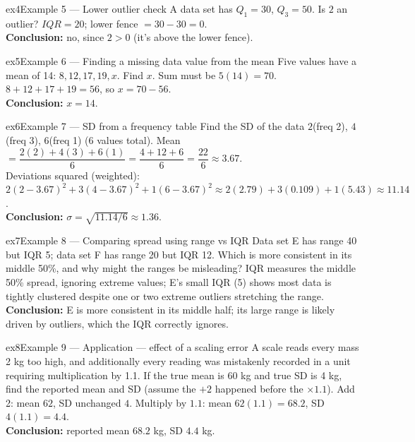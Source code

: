 \documentclass[11pt]{article}
\begin{document}
\begin{example}{ex4}{Example 5 --- Lower outlier check}
A data set has $Q_1=30$, $Q_3=50$. Is $2$ an outlier?\soln
$IQR=20$; lower fence $=30-30=0$.\\[3pt]\textbf{Conclusion:} no, since $2>0$ (it's above the lower fence).
\end{example}

\begin{example}{ex5}{Example 6 --- Finding a missing data value from the mean}
Five values have a mean of 14: $8,12,17,19,x$. Find $x$.\soln
Sum must be $5(14)=70$. $8+12+17+19=56$, so $x=70-56$.\\[3pt]\textbf{Conclusion:} $x=14$.
\end{example}

\begin{example}{ex6}{Example 7 --- SD from a frequency table}
Find the SD of the data $2$(freq 2), $4$(freq 3), $6$(freq 1) (6 values total).\soln
Mean $=\dfrac{2(2)+4(3)+6(1)}{6}=\dfrac{4+12+6}{6}=\dfrac{22}{6}\approx3.67$.\\[3pt]
Deviations squared (weighted): $2(2-3.67)^2+3(4-3.67)^2+1(6-3.67)^2\approx2(2.79)+3(0.109)+1(5.43)\approx11.14$.\\[3pt]\textbf{Conclusion:} $\sigma=\sqrt{11.14/6}\approx1.36$.
\end{example}

\begin{example}{ex7}{Example 8 --- Comparing spread using range vs IQR}
Data set E has range 40 but IQR 5; data set F has range 20 but IQR 12. Which is more consistent in its middle 50\%, and why might the ranges be misleading?\soln
IQR measures the middle 50\% spread, ignoring extreme values; E's small IQR (5) shows most data is tightly clustered despite one or two extreme outliers stretching the range.\\[3pt]\textbf{Conclusion:} E is more consistent in its middle half; its large range is likely driven by outliers, which the IQR correctly ignores.
\end{example}

\begin{example}{ex8}{Example 9 --- Application --- effect of a scaling error}
A scale reads every mass 2 kg too high, and additionally every reading was mistakenly recorded in a unit requiring multiplication by 1.1. If the true mean is 60 kg and true SD is 4 kg, find the reported mean and SD (assume the $+2$ happened before the $\times1.1$).\soln
Add 2: mean $62$, SD unchanged $4$. Multiply by $1.1$: mean $62(1.1)=68.2$, SD $4(1.1)=4.4$.\\[3pt]\textbf{Conclusion:} reported mean $68.2$ kg, SD $4.4$ kg.
\end{example}
\end{document}
